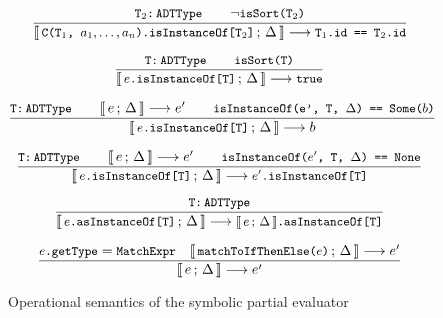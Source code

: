 \documentclass[a4paper,twoside]{article}
\newcommand{\lb}[2]{\llbracket\, #1\,;\, #2\, \rrbracket}
\newcommand{\stt}[1]{\texttt{\small{#1}}}
\begin{document}
\begin{figure}[htb]\ContinuedFloat
\centering
\begin{framed}


\begin{equation}
\dfrac{
  \stt{T$_2$:\,ADTType} \qquad
  \neg \stt{isSort(T$_2$)}
}{
  \lb{\stt{C(T$_1$, $a_1, \ldots, a_n$).isInstanceOf[T$_2$]}}{\Delta}
  \longrightarrow \stt{T$_1$.id == T$_2$.id}
}
\end{equation}

\begin{equation}
\dfrac{
  \stt{T:\,ADTType} \qquad
  \stt{isSort(T)}
}{
  \lb{\stt{$e$.isInstanceOf[T]}}{\Delta} \longrightarrow \stt{true}
}
\end{equation}

\begin{equation}
\dfrac{
  \stt{T:\,ADTType} \qquad
  \lb{e}{\Delta} \longrightarrow e' \qquad
  \stt{isInstanceOf(e', T, $\Delta$) == Some($b$)}
}{
  \lb{\stt{$e$.isInstanceOf[T]}}{\Delta} \longrightarrow b
}
\end{equation}

\begin{equation}
\dfrac{
  \stt{T:\,ADTType} \qquad
  \lb{e}{\Delta} \longrightarrow e' \qquad
  \stt{isInstanceOf($e'$, T, $\Delta$) == None}
}{
  \lb{\stt{$e$.isInstanceOf[T]}}{\Delta} \longrightarrow \stt{$e'$.isInstanceOf[T]}
}
\end{equation}

\begin{equation}
\dfrac{
  \stt{T:\,ADTType}
}{
  \lb{\stt{$e$.asInstanceOf[T]}}{\Delta} \longrightarrow \stt{$\lb{e}{\Delta}$.asInstanceOf[T]}
}
\end{equation}

\begin{equation}
\dfrac{
  \stt{$e$.getType} = \stt{MatchExpr} \quad
  \lb{\stt{matchToIfThenElse($e$)}}{\Delta} \longrightarrow e'
}{
  \lb{e}{\Delta} \longrightarrow e'
}
\end{equation}

\end{framed}
\vspace{-10pt}
\caption{Operational semantics of the symbolic partial evaluator \label{fig:symbolicsem}}
\end{figure}

\end{document}

